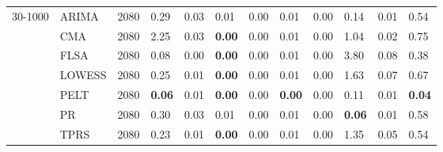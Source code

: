 \begin{table}[ht]
\begin{tabular}{llrlrlrlrlrl}
  30-1000 & ARIMA & 2080 & 0.29 & 0.03 & 0.01 & 0.00 & 0.01 & 0.00 & 0.14 & 0.01 & 0.54 \\ 
   & CMA & 2080 & 2.25 & 0.03 & \textbf{0.00} & 0.00 & 0.01 & 0.00 & 1.04 & 0.02 & 0.75 \\ 
   & FLSA & 2080 & 0.08 & 0.00 & \textbf{0.00} & 0.00 & 0.01 & 0.00 & 3.80 & 0.08 & 0.38 \\ 
   & LOWESS & 2080 & 0.25 & 0.01 & \textbf{0.00} & 0.00 & 0.01 & 0.00 & 1.63 & 0.07 & 0.67 \\ 
   & PELT & 2080 & \textbf{0.06} & 0.01 & \textbf{0.00} & 0.00 & \textbf{0.00} & 0.00 & 0.11 & 0.01 & \textbf{0.04} \\ 
   & PR & 2080 & 0.30 & 0.03 & 0.01 & 0.00 & 0.01 & 0.00 & \textbf{0.06} & 0.01 & 0.58 \\ 
   & TPRS & 2080 & 0.23 & 0.01 & \textbf{0.00} & 0.00 & 0.01 & 0.00 & 1.35 & 0.05 & 0.54 \\ 
   \bottomrule
\end{tabular}
\end{table}
